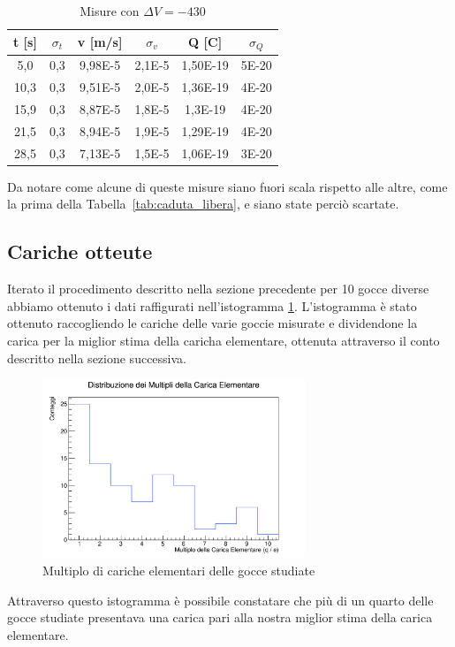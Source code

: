 \documentclass[a4paper,12pt]{article}
\begin{document}
\begin{table}[H]
    \centering
    \caption{Misure con $\Delta V = -430$}
    \label{tab:campo_elettrico_goccia_sale}
    \begin{tabular}{cccccc}
    \toprule
    \textbf{t [s]} & \textbf{$\sigma_t$} & \textbf{v [m/s]} & \textbf{$\sigma_v$} & \textbf{Q [C]} & \textbf{$\sigma_Q$} \\
    \midrule
    5,0 & 0,3 & 9,98E-5 & 2,1E-5 & 1,50E-19 & 5E-20 \\
    10,3 & 0,3 & 9,51E-5 & 2,0E-5 & 1,36E-19 & 4E-20 \\
    15,9 & 0,3 & 8,87E-5 & 1,8E-5 & 1,3E-19 & 4E-20 \\
    21,5 & 0,3 & 8,94E-5 & 1,9E-5 & 1,29E-19 & 4E-20 \\
    28,5 & 0,3 & 7,13E-5 & 1,5E-5 & 1,06E-19 & 3E-20 \\
    \bottomrule
    \end{tabular}
\end{table}

Da notare come alcune di queste misure siano fuori scala rispetto alle altre, come la prima della Tabella~\ref{tab:caduta_libera}, e siano state perciò scartate. 


\subsection{Cariche otteute}
Iterato il procedimento descritto nella sezione precedente per 10 gocce diverse abbiamo ottenuto i dati raffigurati nell'istogramma \ref{fig:Istogramma}. L'istogramma è stato ottenuto raccogliendo le cariche delle varie goccie misurate e dividendone la carica per la miglior stima della caricha elementare, ottenuta attraverso il conto descritto nella sezione successiva.
\begin{figure}[H]
    \centering
    \includegraphics[width=0.7\textwidth]{Istogramma.png}
    \caption{Multiplo di cariche elementari delle gocce studiate}
    \label{fig:Istogramma}
\end{figure}
Attraverso questo istogramma è possibile constatare che più di un quarto delle gocce studiate presentava una carica pari alla nostra miglior stima della carica elementare.
\end{document}
